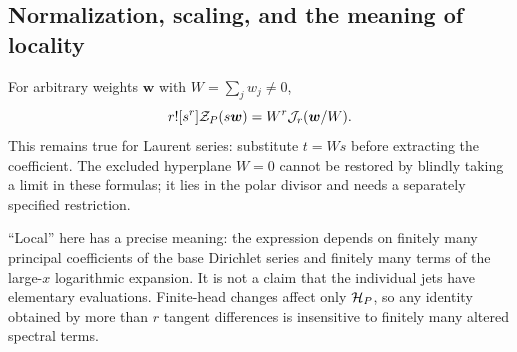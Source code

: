 \subsection{Normalization, scaling, and the meaning of locality}
For arbitrary weights $\boldsymbol w$ with $W=\sum_jw_j\ne0$,
\begin{equation}\label{asj:eq:scaling}
 r![s^r]\mathcal Z_P(s\boldsymbol w)
   =W^r\mathcal J_r(\boldsymbol w/W).
\end{equation}
This remains true for Laurent series: substitute $t=Ws$ before extracting
the coefficient. The excluded hyperplane $W=0$ cannot be restored by
blindly taking a limit in these formulas; it lies in the polar divisor
and needs a separately specified restriction.

``Local'' here has a precise meaning: the expression depends on finitely
many principal coefficients of the base Dirichlet series and finitely many
terms of the large-$x$ logarithmic expansion. It is not a claim that the
individual jets have elementary evaluations. Finite-head changes affect
only $\mathcal H_P$, so any identity obtained by more than $r$ tangent differences
is insensitive to finitely many altered spectral terms.
